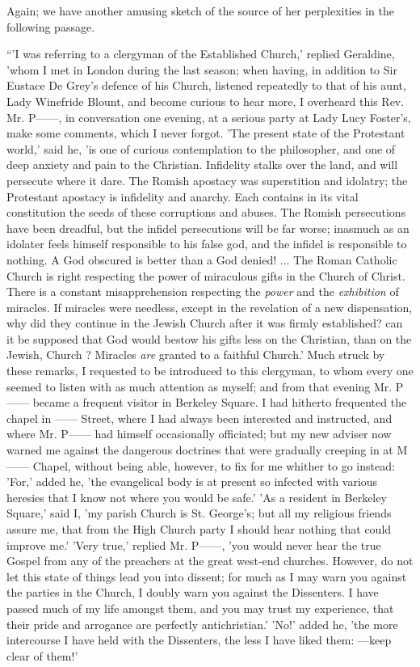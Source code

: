 Again; we have another amusing sketch of the source
of her perplexities in the following passage.

``'I was referring to a clergyman of
the Established Church,' replied Geraldine, 'whom I met in London during
the last season; when having, in addition to
Sir Eustace De Grey's defence of his Church, listened repeatedly to that
of his aunt, Lady Winefride Blount, and become curious to hear more, I
overheard this Rev. Mr. P——, in conversation one evening, at a
serious party at Lady Lucy Foster's, make some comments, which I never
forgot. 'The present state of the Protestant world,' said he, 'is one of
curious contemplation to the philosopher, and one of deep anxiety and
pain to the Christian. Infidelity stalks over the land, and will
persecute where it dare. The Romish apostacy was superstition and
idolatry; the Protestant apostacy is infidelity and anarchy. Each
contains in its vital constitution the seeds of these corruptions and
abuses. The Romish persecutions have been dreadful, but the infidel
persecutions will be far worse; inasmuch as an idolater feels himself
responsible to his false god, and the infidel is responsible to nothing.
A God obscured is better than a God denied! ... The Roman Catholic
Church is right respecting the power of miraculous gifts in the Church
of Christ. There is a constant misapprehension respecting the \emph{power}
and the \emph{exhibition} of miracles. If miracles were needless, except
in the revelation of a new dispensation, why did they continue in the
Jewish Church after it was firmly established? can it be supposed that
God would bestow his gifts less on the Christian, than on the Jewish,
Church ? Miracles \emph{are} granted to a faithful Church.' Much struck
by these remarks, I requested to be introduced to this clergyman, to
whom every one seemed to listen with as much attention as myself; and
from that evening Mr. P—— became a frequent visitor in Berkeley
Square. I had hitherto frequented the chapel in —— Street, where I
had always been interested and instructed, and where Mr. P—— had
himself occasionally officiated; but my new adviser now warned me
against the dangerous doctrines that were gradually creeping in at
M—— Chapel, without being able, however, to fix for me whither to go
instead: 'For,' added he, 'the evangelical body is at present so
infected with various heresies that I know not where you would be safe.'
'As a resident in Berkeley Square,' said I, 'my parish Church is St.
George's; but all my religious friends assure me, that from the High
Church party I should hear nothing that could improve me.' 'Very true,'
replied Mr. P——, 'you would never hear the true Gospel from any of
the preachers at the great west-end churches. However, do not let this
state of things lead you into dissent; for much as I may warn you
against the parties in the Church, I doubly warn you against the
Dissenters. I have passed much of my life amongst them, and you may
trust my experience, that their pride and arrogance are perfectly
antichristian.' 'No!' added he, 'the more intercourse I have held with
the Dissenters, the less I have liked them: —keep clear of them!'

